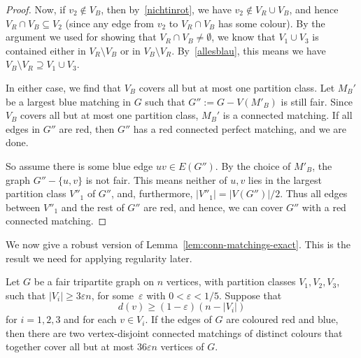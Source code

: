 \documentclass[a4paper,10pt]{article}
\let\eps\varepsilon
\begin{document}
\begin{proof}
Now, if $v_2\notin V_B$, then by~\eqref{nichtinrot}, we have $v_2\notin V_R \cup V_B$, and hence $V_R \cap V_B\subseteq V_2$ (since any edge from $v_2$ to $V_R \cap V_B$ has some colour). 
By the argument we used for showing that $V_R \cap V_B\neq\emptyset$, we know that $V_1\cup V_3$ is contained either in $V_R\setminus V_B$ or in $V_B\setminus V_R$. 
By~\eqref{allesblau}, this means we have $V_B\setminus V_R\supseteq V_1\cup V_3$.

In either case, we find that  $V_B$ covers all but at most one partition class. 
Let $M_B'$ be a largest blue matching in $G$ such that $G'':=G-V(M'_B)$ is still fair.
Since $V_B$ covers all but at most one partition class, $M_B'$ is a connected matching.
If all edges in $G''$ are red, then $G''$ has a red connected perfect matching, and we are done. 

So assume there is some blue edge $uv \in E(G'')$. 
By the choice of $M'_B$, the graph $G''-\{u,v\}$ is not fair. This means neither of $u,v$ lies in the largest partition class $V''_1$ of $G''$, and, furthermore, $|V''_1|=|V(G'')|/2$. Thus all edges between $V''_1$ and the rest of $G''$ are red, and hence, we can cover $G''$ with a red connected matching.
 \end{proof}
 
We now give a robust version of Lemma~\ref{lem:conn-matchings-exact}. This is the result we need for applying regularity later. 
 
\begin{lemma}\label{lem:conn-matchings-robust}
Let $G$ be a fair tripartite graph on $n$ vertices, with partition classes $V_1,V_2,V_3$, such that $|V_i|\geq 3\eps n$, for some~$\eps$ with $0<\varepsilon <1/5$. Suppose that $$d(v)\geq (1-\varepsilon) (n-|V_i|)$$ for $i=1,2,3$ and for each $v\in V_i$. If  the edges of $G$ are coloured red and blue, then there are two vertex-disjoint connected matchings of distinct colours that together cover all but at most $36\varepsilon n$ vertices of $G$.
\end{lemma}
\end{document}
